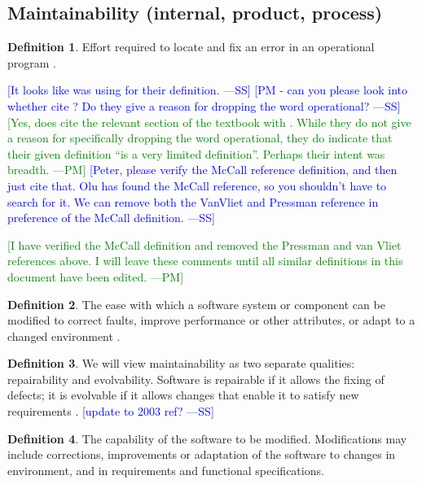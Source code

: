 \documentclass[letterpaper, cleveref]{lipics-v2019}
\newcommand{\authornote}[3]{\textcolor{#1}{[#3 ---#2]}}
\newcommand{\authornote}[3]{}
\newcommand{\wss}[1]{\authornote{blue}{SS}{#1}} %
\newcommand{\pmi}[1]{\authornote{green}{PM}{#1}} %
\newcommand{\notdone}[1]{\textcolor{red}{#1}}
\theoremstyle{definition}
\newtheorem{defn}{Definition}
\begin{document}
\subsection{Maintainability (internal, product, process)} %

\begin{defn}
  Effort required to locate and fix an error in an operational program
  \citep{McCallEtAl1977}.

  \wss{It looks like \citet{pressman2005software} was using
  \citet{McCallEtAl1977} for their definition.} \wss{PM - can you please
  look into whether \citet{pressman2005software} cite
  \citet{McCallEtAl1977}?  Do they give a reason for dropping the word
  operational?}  \pmi{Yes, \citet{pressman2005software} does cite the
  relevant section of the textbook with \citet{McCallEtAl1977}. While they
  do not give a reason for specifically dropping the word operational, they
  do indicate that their given definition ``is a very limited definition''.
  Perhaps their intent was breadth.} \wss{Peter, please verify the McCall
  reference definition, and then just cite that.  Olu has found the McCall
  reference, so you shouldn't have to search for it.  We can remove both the
  VanVliet and Pressman reference in preference of the McCall definition.}

  \pmi{I have verified the McCall definition and removed the Pressman and
  van Vliet references above. I will leave these comments until all similar
  definitions in this document have been edited.}
\end{defn}

\begin{defn} \label{MaintainabilityDefnSelected1} 
  The ease with which a software system or component can be modified to correct
  faults, improve performance or other attributes, or adapt to a changed
  environment \citep{IEEEStdGlossarySET1990}.
\end{defn}

\begin{defn}
  We will view maintainability as two separate qualities: repairability and
  evolvability. Software is repairable if it allows the fixing of defects;
  it is evolvable if it allows changes that enable it to satisfy new
  requirements \citep{ghezzi1991fundamentals}. \wss{update to 2003 ref?}
\end{defn}

\begin{defn}
  The capability of the software to be modified.  Modifications may include
  corrections, improvements or adaptation of the software to changes in
  environment, and in requirements and functional specifications.
  \cite{ISO9126} %
\end{defn}
\end{document}
